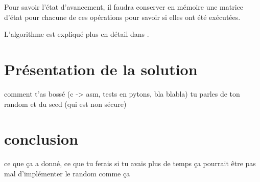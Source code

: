 \documentclass[letterpaper]{article}
\begin{document}
Pour savoir l'état d'avancement, il faudra conserver en mémoire une matrice d'état pour chacune de ces opérations pour savoir si elles ont été exécutées.

L'algorithme est expliqué plus en détail dans \cite{FernandesMedeiros2012}.

\section{Présentation de la solution}
comment t'as bossé (c -> asm, tests en pytons, bla blabla)
tu parles de ton random et du seed (qui est non sécure)

\section{conclusion}
ce que ça a donné, ce que tu ferais si tu avais plus de temps
ça pourrait être pas mal d'implémenter le random comme ça


\footnotesize


\end{document}
